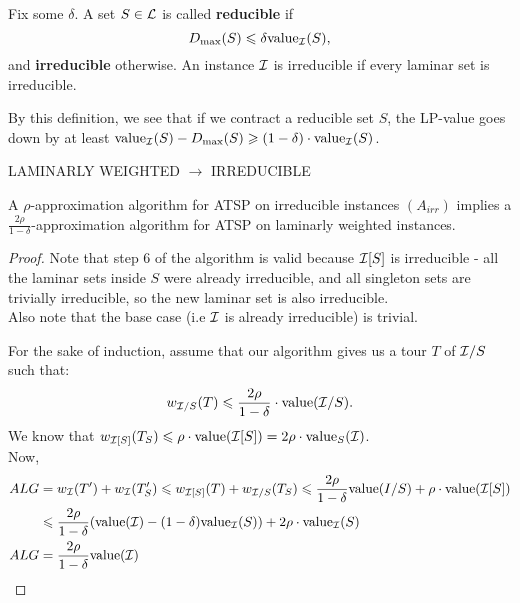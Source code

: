 \documentclass[./main.tex]{subfiles}
\begin{document}
	\begin{definition}
		Fix some $\delta$. A set $S\in \mathcal{L}$ is called \textbf{reducible} if
		\[
			D_{\max}(S) \leqslant \delta \textup{value}_{\mathcal{I}}(S),
		\] 
		and \textbf{irreducible} otherwise. 
		An instance $\mathcal{I}$ is irreducible if every laminar set is irreducible.
	\end{definition}
	
	By this definition, we see that if we contract a reducible set $S$, the LP-value goes down by at least $\textup{value}_{\mathcal{I}}(S) - D_{\max}(S) \geqslant(1-\delta)\cdot \textup{value}_{\mathcal{I}}(S)$.\\
	
	\begin{algorithm}[h]\label{alg:1}
		\caption{LAMINARLY WEIGHTED $\rightarrow$ IRREDUCIBLE}
	\end{algorithm}
	
	\begin{theorem} 
		A $\rho$-approximation algorithm for ATSP on irreducible instances $(A_{irr})$ implies a $\frac{2\rho}{1-\delta}$-approximation algorithm for ATSP on laminarly weighted instances.
	\end{theorem}
	\begin{proof}
		Note that step 6 of the algorithm is valid because $\mathcal{I}[S]$ is irreducible - all the laminar sets inside $S$ were already irreducible, and all singleton sets are trivially irreducible, so the new laminar set is also irreducible.\\
		Also note that the base case (i.e $\mathcal{I}$ is already irreducible) is trivial.

		For the sake of induction, assume that our algorithm gives us a tour $T$ of $\mathcal{I}/S$ such that:
		\[
			w_{\mathcal{I}/S}(T) \leqslant \frac{2\rho}{1-\delta}\cdot \textup{value}(\mathcal{I}/S).
		\]
		We know that $w_{\mathcal{I}[S]}(T_S)\leqslant \rho\cdot \textup{value}(\mathcal{I}[S]) = 2\rho\cdot\textup{value}_S(\mathcal{I})$.\\
		Now,
		\begin{align*}
				ALG &= w_{\mathcal{I}}(T') + w_{\mathcal{I}}(T_S') \leqslant w_{\mathcal{I}[S]}(T) + w_{\mathcal{I}/S}(T_S) \leqslant \frac{2\rho}{1-\delta}\textup{value}(I/S) + \rho\cdot \textup{value}(\mathcal{I}[S])\\
				&\leqslant \frac{2\rho}{1-\delta}(\textup{value}(\mathcal{I}) - (1-\delta) \textup{value}_{\mathcal{I}}(S)) + 2\rho\cdot\textup{value}_{\mathcal{I}}(S)\\
				ALG &= \frac{2\rho}{1-\delta} \textup{value}(\mathcal{I})
		\end{align*}
	\end{proof}
\end{document}
